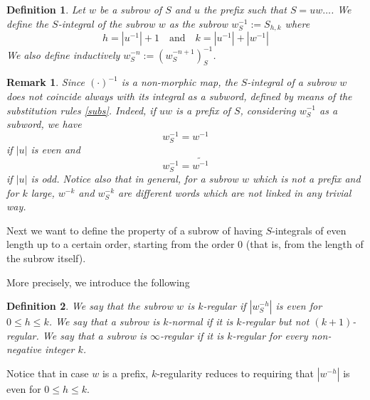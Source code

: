 \documentclass[10pt,a4paper]{article}
\newtheorem{rem}{Remark}
\newtheorem{defi}{Definition}
\begin{document}
\begin{defi}
Let $w$ be a subrow of $S$ and $u$ the prefix such that $S=uw\dots$. We define the $S$-integral of the subrow $w$ as the subrow $w^{-1}_{S}:=S_{h,k}$ where $$h=|u^{-1}|+1\quad\text{and} \quad k=|u^{-1}|+|w^{-1}|$$
We also define inductively $w^{-n}_S:=\left(w^{-n+1}_S\right)^{-1}_S$.
\label{subsint}
\end{defi}
\begin{rem} Since $(\cdot)^{-1}$ is a non-morphic map, the $S$-integral of a subrow $w$ does not coincide always with its integral as a subword, defined by means of the substitution rules \eqref{subs}. Indeed, if $uw$ is a prefix of $S$, considering $w^{-1}_S$ as a subword, we have
$$w^{-1}_{S}=w^{-1}$$ if $|u|$ is even and $$w^{-1}_{S}=\widetilde{w^{-1}}$$ if $|u|$ is odd. Notice also that in general, for a subrow $w$ which is not a prefix and for $k$ large, $w^{-k}$ and $w_S^{-k}$ are different words which are not linked in any trivial way.
\label{remsint}
\end{rem}

Next we want to define the property of a subrow of having $S$-integrals of even length up to a certain order, starting from the order 0 (that is, from the length of the subrow itself).

More precisely, we introduce the following
\begin{defi}
We say that the subrow $w$ 
is $k$\textit{-regular} if 
$|w^{-h}_S|$ is even for $0\le h\le k$. We say that a subrow is $k$\textit{-normal} if it is $k$-regular but not $(k+1)$-regular. We say that a subrow is $\infty$\textit{-regular} if it is $k$-regular for every non-negative integer $k$.
\end{defi}
Notice that in case $w$ is a prefix, $k$-regularity reduces to requiring that $|w^{-h}|$ is even for $0\le h\le k$. 
\end{document}
